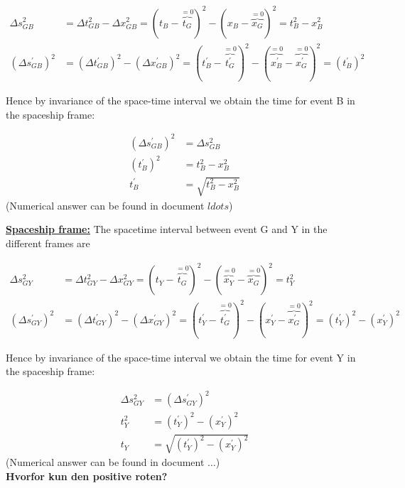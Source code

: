 \documentclass[a4paper,10pt,english]{article}
\begin{document}
\begin{enumerate}
\begin{enumerate}
\begin{align*}
\Delta s_{GB}^2&=\Delta t_{GB}^2-\Delta x_{GB}^2=(t_{B}-\overbrace{t_{G}}^{=0})^2-(x_{B}-\overbrace{x_{G}}^{=0})^2=t_{B}^2-x_{B}^2\\
(\Delta s_{GB}^{\prime})^2&=(\Delta t_{GB}^{\prime})^2-(\Delta x_{GB}^{\prime})^2=(t_{B}^{\prime}-\overbrace{t^{\prime}_{G}}^{=0})^2-(\overbrace{x_{B}^{\prime}}^{=0}-\overbrace{x^{\prime}_{G}}^{=0})^2=(t_{B}^{\prime})^2
\end{align*}

Hence by invariance of the space-time interval we obtain the time for event B in the spaceship frame:

\begin{align}
(\Delta s_{GB}^{\prime})^2&=\Delta s_{GB}^2 \nonumber\\
(t_{B}^{\prime})^2&=t_{B}^2-x_{B}^2 \nonumber\\
t_{B}^{\prime}&=\sqrt{t_{B}^2-x_{B}^2} \label{eq:unknown_t_planet}
\end{align}
(Numerical answer can be found in document $ldots$)

\underline{\bf{Spaceship frame:}} The spacetime interval between event G and Y in the different frames are

\begin{align*}
\Delta s_{GY}^2&=\Delta t_{GY}^2-\Delta x_{GY}^2=(t_{Y}-\overbrace{t_{G}}^{=0})^2-(\overbrace{x_{Y}}^{=0}-\overbrace{x_{G}}^{=0})^2=t_{Y}^2\\
(\Delta s_{GY}^{\prime})^2&=(\Delta t_{GY}^{\prime})^2-(\Delta x_{GY}^{\prime})^2=(t_{Y}^{\prime}-\overbrace{t_{G}^{\prime}}^{=0})^2-(x_{Y}^{\prime}-\overbrace{x_{G}^{\prime}}^{=0})^2=(t_{Y}^{\prime})^2-(x_{Y}^{\prime})^2
\end{align*}

Hence by invariance of the space-time interval we obtain the time for event Y in the spaceship frame:

\begin{align}
\Delta s_{GY}^2&=(\Delta s_{GY}^{\prime})^2 \nonumber\\
t_{Y}^{2}&=(t^{\prime}_{Y})^{2}-(x^{\prime}_{Y})^{2} \nonumber\\%
t_{Y}&=\sqrt{(t^{\prime}_{Y})^{2}-(x^{\prime}_{Y})^{2}} \label{eq:unknown_t_spaceship}%
\end{align}
(Numerical answer can be found in document $\ldots$)
\\ \textbf{Hvorfor kun den positive roten?}


\end{enumerate}
\end{enumerate}
\end{document}
